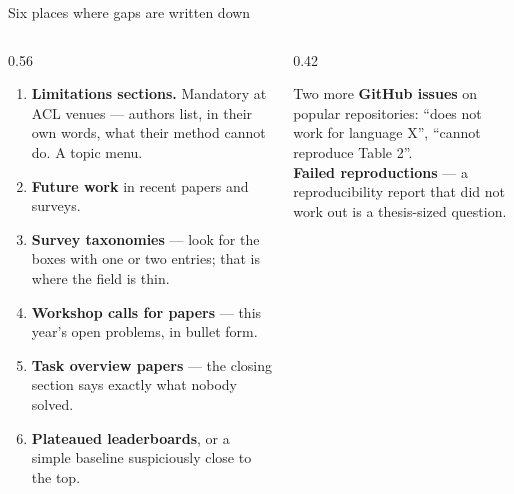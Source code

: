 \documentclass[aspectratio=169,11pt]{beamer}
\newcommand{\key}[1]{\textbf{\color{brand}#1}}
\begin{document}
\begin{frame}{Six places where gaps are written down}
\begin{columns}[T]
\begin{column}{0.56\textwidth}
\footnotesize
\begin{enumerate}
  \item \key{Limitations sections.} Mandatory at ACL venues --- authors list,
        in their own words, what their method cannot do. A topic menu.
  \item \key{Future work} in recent papers and surveys.
  \item \key{Survey taxonomies} --- look for the boxes with one or two
        entries; that is where the field is thin.
  \item \key{Workshop calls for papers} --- this year's open problems, in
        bullet form.
  \item \key{Task overview papers} --- the closing section says exactly what
        nobody solved.
  \item \key{Plateaued leaderboards}, or a simple baseline suspiciously close
        to the top.
\end{enumerate}
\end{column}
\begin{column}{0.42\textwidth}
\begin{block}{Two more}
\footnotesize
\key{GitHub issues} on popular repositories: ``does not work for language X'',
``cannot reproduce Table 2''.\\[4pt]
\key{Failed reproductions} --- a reproducibility report that did not work out
is a thesis-sized question.
\end{block}
\end{column}
\end{columns}
\end{frame}
\end{document}
